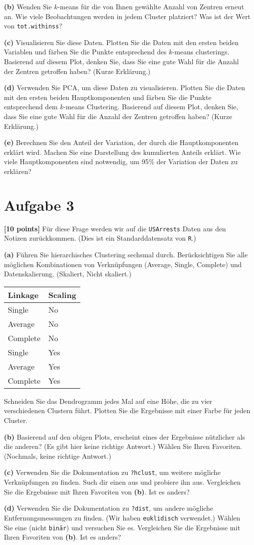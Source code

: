 \documentclass[]{article}
\begin{document}
\textbf{(b)} Wenden Sie \(k\)-means für die von Ihnen gewählte Anzahl
von Zentren erneut an. Wie viele Beobachtungen werden in jedem Cluster
platziert? Was ist der Wert von \texttt{tot.withinss}?

\textbf{(c)} Visualisieren Sie diese Daten. Plotten Sie die Daten mit
den ersten beiden Variablen und färben Sie die Punkte entsprechend des
\(k\)-means clusterings. Basierend auf diesem Plot, denken Sie, dass Sie
eine gute Wahl für die Anzahl der Zentren getroffen haben? (Kurze
Erklärung.)

\textbf{(d)} Verwenden Sie PCA, um diese Daten zu visualisieren. Plotten
Sie die Daten mit den ersten beiden Hauptkomponenten und färben Sie die
Punkte entsprechend dem \(k\)-means Clustering. Basierend auf diesem
Plot, denken Sie, dass Sie eine gute Wahl für die Anzahl der Zentren
getroffen haben? (Kurze Erklärung.)

\textbf{(e)} Berechnen Sie den Anteil der Variation, der durch die
Hauptkomponenten erklärt wird. Machen Sie eine Darstellung des
kumulierten Anteils erklärt. Wie viele Hauptkomponenten sind notwendig,
um 95\% der Variation der Daten zu erklären?

\hypertarget{aufgabe-3}{%
\section{Aufgabe 3}\label{aufgabe-3}}

\textbf{{[}10 points{]}} Für diese Frage werden wir auf die
\texttt{USArrests} Daten aus den Notizen zurückkommen. (Dies ist ein
Standarddatensatz von \texttt{R}.)

\textbf{(a)} Führen Sie hierarchisches Clustering sechsmal durch.
Berücksichtigen Sie alle möglichen Kombinationen von Verknüpfungen
(Average, Single, Complete) und Datenskalierung. (Skaliert, Nicht
skaliert.)

\begin{longtable}[]{@{}ll@{}}
\toprule
Linkage & Scaling\tabularnewline
\midrule
\endhead
Single & No\tabularnewline
Average & No\tabularnewline
Complete & No\tabularnewline
Single & Yes\tabularnewline
Average & Yes\tabularnewline
Complete & Yes\tabularnewline
\bottomrule
\end{longtable}

Schneiden Sie das Dendrogramm jedes Mal auf eine Höhe, die zu vier
verschiedenen Clustern führt. Plotten Sie die Ergebnisse mit einer Farbe
für jeden Cluster.

\textbf{(b)} Basierend auf den obigen Plots, erscheint eines der
Ergebnisse nützlicher als die anderen? (Es gibt hier keine richtige
Antwort.) Wählen Sie Ihren Favoriten. (Nochmals, keine richtige
Antwort.)

\textbf{(c)} Verwenden Sie die Dokumentation zu \texttt{?hclust}, um
weitere mögliche Verknüpfungen zu finden. Such dir einen aus und
probiere ihn aus. Vergleichen Sie die Ergebnisse mit Ihren Favoriten von
\textbf{(b)}. Ist es anders?

\textbf{(d)} Verwenden Sie die Dokumentation zu \texttt{?dist}, um
andere mögliche Entfernungsmessungen zu finden. (Wir haben
\texttt{euklidisch} verwendet.) Wählen Sie eine (nicht \texttt{binär})
und versuchen Sie es. Vergleichen Sie die Ergebnisse mit Ihren Favoriten
von \textbf{(b)}. Ist es anders?
\end{document}
